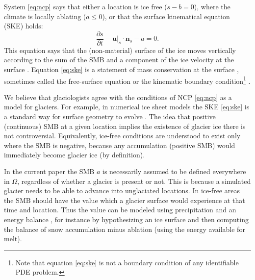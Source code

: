 \documentclass[hidelinks,onefignum,onetabnum,final]{siamart220329}  %
\newcommand{\bn}{\mathbf{n}}
\newcommand{\bu}{\mathbf{u}}
\begin{document}
System \eqref{eq:ncp} says that either a location is ice free ($s-b=0$), where the climate is locally ablating ($a\le 0$), or that the surface kinematical equation (SKE) holds:
\begin{equation}
\frac{\partial s}{\partial t} - \bu|_s \cdot \bn_s - a = 0.  \label{eq:ske}
\end{equation}
This equation says that the (non-material) surface of the ice moves vertically according to the sum of the SMB and a component of the ice velocity at the surface \cite{SchoofHewitt2013}.  Equation \eqref{eq:ske} is a statement of mass conservation at the surface \cite{Aschwandenetal2012}, sometimes called the free-surface equation \cite{LofgrenAhlkronaHelanow2022} or the kinematic boundary condition\footnote{Note that equation \eqref{eq:ske} is not a boundary condition of any identifiable PDE problem.} \cite{GreveBlatter2009}.

We believe that glaciologists agree with the conditions of NCP \eqref{eq:ncp} as a model for glaciers.  For example, in numerical ice sheet models the SKE \eqref{eq:ske} is a standard way for surface geometry to evolve \cite{GreveBlatter2009,SchoofHewitt2013}.  The idea that positive (continuous) SMB at a given location implies the existence of glacier ice there is not controversial.  Equivalently, ice-free conditions are understood to exist only where the SMB is negative, because any accumulation (positive SMB) would immediately become glacier ice (by definition).

In the current paper the SMB $a$ is necessarily assumed to be defined everywhere in $\Omega$, regardless of whether a glacier is present or not.  This is because a simulated glacier needs to be able to advance into unglaciated locations. In ice-free areas the SMB should have the value which a glacier surface would experience at that time and location.  Thus the value can be modeled using precipitation and an energy balance \cite{GreveBlatter2009}, for instance by hypothesizing an ice surface and then computing the balance of snow accumulation minus ablation (using the energy available for melt).
\end{document}
